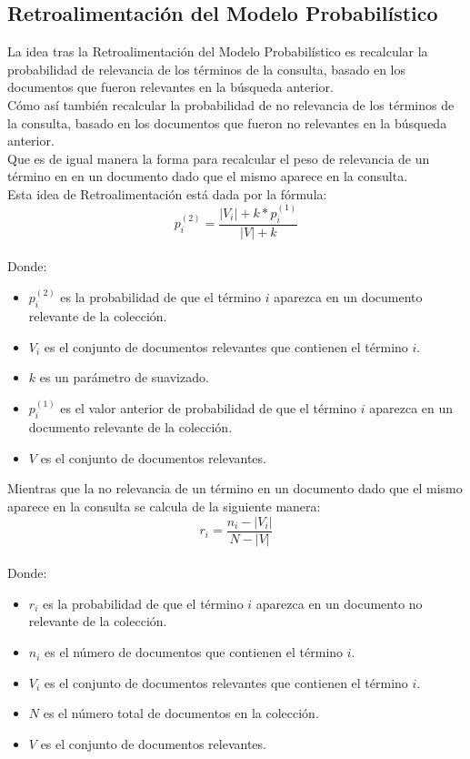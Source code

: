 \documentclass{llncs}
\begin{document}
	\subsection{Retroalimentaci\'on del Modelo Probabil\'istico}
	La idea tras la Retroalimentaci\'on del Modelo Probabil\'istico es recalcular la probabilidad de
	relevancia de los t\'erminos de la consulta, basado en los documentos que fueron relevantes en la
	b\'usqueda anterior.\\
	C\'omo as\'i tambi\'en recalcular la probabilidad de no relevancia de los t\'erminos de la consulta,
	basado en los documentos que fueron no relevantes en la b\'usqueda anterior.\\
	Que es de igual manera la forma para recalcular el peso de relevancia de un t\'ermino en en un documento dado 
	que el mismo aparece en la consulta.\\
	Esta idea de Retroalimentaci\'on est\'a dada por la f\'ormula:\\
	\begin{equation}
		p_{i}^{(2)} = \frac{|V_{i}| + k * p_{i}^{(1)}}{|V| + k}
	\end{equation}
	\\
	Donde: \\
	\begin{itemize}
		\item $p_{i}^{(2)}$ es la probabilidad de que el t\'ermino $i$ aparezca en un documento relevante de la colecci\'on.
		\item $V_{i}$ es el conjunto de documentos relevantes que contienen el t\'ermino $i$.
		\item $k$ es un par\'ametro de suavizado.
		\item $p_{i}^{(1)}$ es el valor anterior de probabilidad de que el t\'ermino $i$ aparezca en un documento relevante de la colecci\'on.
		\item $V$ es el conjunto de documentos relevantes.
	\end{itemize}

    
	Mientras que la no relevancia de un t\'ermino en un documento dado que el mismo aparece en la consulta se calcula de la siguiente manera:\\
	\begin{equation}
		r_{i} = \frac{n_{i} - |V_{i}|}{N - |V|}
	\end{equation}
	\\
	Donde: \\
	\begin{itemize}
		\item $r_{i}$ es la probabilidad de que el t\'ermino $i$ aparezca en un documento no relevante de la colecci\'on.
		\item $n_{i}$ es el n\'umero de documentos que contienen el t\'ermino $i$.
		\item $V_{i}$ es el conjunto de documentos relevantes que contienen el t\'ermino $i$.
		\item $N$ es el n\'umero total de documentos en la colecci\'on.
		\item $V$ es el conjunto de documentos relevantes.
	\end{itemize}
\end{document}
